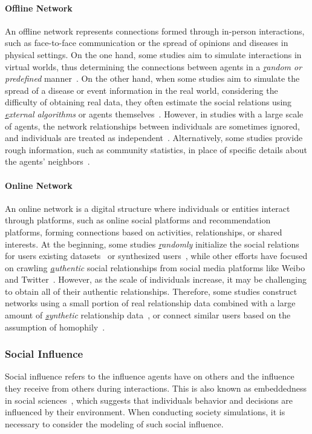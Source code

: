 \paragraph{Offline Network}
An offline network represents connections formed through in-person interactions, such as face-to-face communication or the spread of opinions and diseases in physical settings. On the one hand, some studies aim to simulate interactions in virtual worlds, thus determining the connections between agents in a \textit{{\ul random or predefined}} manner~\cite{park2023generative,yu2024affordable,ren2024emergence}. On the other hand, when some studies aim to simulate the spread of a disease or event information in the real world, considering the difficulty of obtaining real data, they often estimate the social relations using \textit{{\ul external algorithms}} or agents themselves~\cite{xiao2023simulating,williams2023epidemic}. However, in studies with a large scale of agents, the network relationships between individuals are sometimes ignored, and individuals are treated as independent~\cite{zhang2024electionsim}. Alternatively, some studies provide rough information, such as community statistics, in place of specific details about the agents' neighbors~\cite{chopra2024limits}.


\paragraph{Online Network}
An online network is a digital structure where individuals or entities interact through platforms, such as online social platforms and recommendation platforms, forming connections based on activities, relationships, or shared interests. At the beginning, some studies \textit{{\ul randomly}} initialize the social relations for users existing datasets~\cite{wang2023recagent} or synthesized users~\cite{liu2024skepticism}, while other efforts have focused on crawling \textit{{\ul authentic}} social relationships from social media platforms like Weibo~\cite{gao2023s3} and Twitter~\cite{mou2024unveiling}. However, as the scale of individuals increase, it may be challenging to obtain all of their authentic relationships. Therefore, some studies construct networks using a small portion of real relationship data combined with a large amount of \textit{{\ul synthetic}} relationship data~\cite{yang2024oasis}, or connect similar users based on the assumption of homophily~\cite{tang2024synthesizing}.


\subsubsection{Social Influence}
Social influence refers to the influence agents have on others and the influence they receive from others during interactions. This is also known as embeddedness in social sciences~\cite{squazzoni2014social}, which suggests that individuals behavior and decisions are influenced by their environment. When conducting society simulations, it is necessary to consider the modeling of such social influence.

